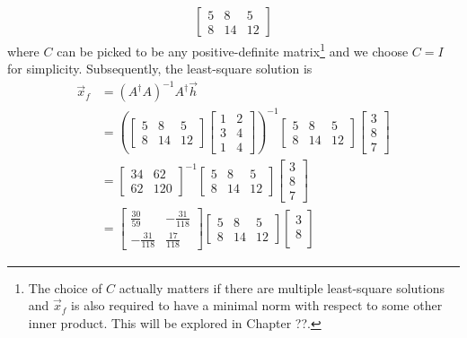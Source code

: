 \begin{solution}
\begin{align*}
\begin{bmatrix}
5&8&5\\ 
8&14&12
\end{bmatrix}
\end{align*}
where $C$ can be picked to be any positive-definite matrix\footnote{The choice of $C$ actually matters if there are multiple least-square solutions and $\vec{x}_f$ is also required to have a minimal norm with respect to some other inner product. This will be explored in Chapter ??.} and we choose $C = I$ for simplicity. Subsequently, the least-square solution is
\begin{align*}
\vec{x}_f &= (A^\dag A)^{-1}A^\dag \vec{h} \\
&=
\left(\begin{bmatrix}
5&8&5\\ 
8&14&12
\end{bmatrix}
\begin{bmatrix}
1 & 2 \\
3 & 4 \\
1 & 4
\end{bmatrix}\right)^{-1}
\begin{bmatrix}
5&8&5\\ 
8&14&12
\end{bmatrix}
\begin{bmatrix}
3 \\
8 \\
7
\end{bmatrix} \\
&=
\begin{bmatrix}
34&62\\ 
62&120
\end{bmatrix}^{-1}
\begin{bmatrix}
5&8&5\\ 
8&14&12
\end{bmatrix}
\begin{bmatrix}
3 \\
8 \\
7
\end{bmatrix} \\
&= 
\begin{bmatrix}
\frac{30}{59}&-\frac{31}{118}\\ 
-\frac{31}{118}&\frac{17}{118}
\end{bmatrix}
\begin{bmatrix}
5&8&5\\ 
8&14&12
\end{bmatrix}
\begin{bmatrix}
3 \\
8 \\

\end{bmatrix}
\end{align*}
\end{solution}
